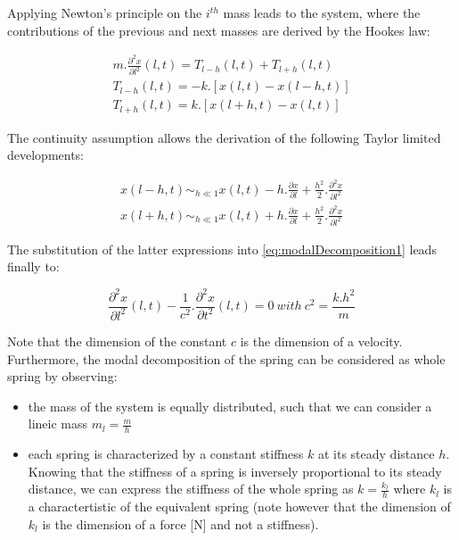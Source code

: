 Applying Newton's principle on the $i^{th}$ mass leads to the system, where the contributions of the previous and next masses are derived by the Hookes law:

\begin{eqnarray}
	m . \frac{\partial^2{x}}{\partial{l^2}}(l, t) = T_{l-h}(l, t) + T_{l+h}(l, t) \label{eq:modalDecomposition1} \\
	T_{l-h}(l, t) = -k . [x(l, t) - x(l-h, t)] \nonumber \\
	T_{l+h}(l, t) = k . [x(l+h, t) - x(l, t)] \nonumber
\end{eqnarray}

The continuity assumption allows the derivation of the following Taylor limited developments:

$$
\begin{array}{l}
	x(l-h, t) \sim_{h \ll 1} x(l, t) - h . \frac{\partial x}{\partial l} + \frac{h^2}{2} . \frac{\partial^2 x}{\partial l^2} \\
	x(l+h, t) \sim_{h \ll 1} x(l, t) + h . \frac{\partial x}{\partial l} + \frac{h^2}{2} . \frac{\partial^2 x}{\partial l^2}
\end{array}
$$

The substitution of the latter expressions into \myequname \eqref{eq:modalDecomposition1} leads finally to:

\begin{equation}
	\frac{\partial^2{x}}{\partial{l^2}}(l, t) - \frac{1}{c^2} . \frac{\partial^2{x}}{\partial{t^2}}(l, t) = 0\ with\ c^2 = \frac{k.h^2}{m} \label{eq:modalDecomposition2}
\end{equation}

Note that the dimension of the constant $c$ is the dimension of a velocity. Furthermore, the modal decomposition of the spring can be considered as whole spring by observing:

\begin{itemize}
	\item the mass of the system is equally distributed, such that we can consider a lineic mass $m_l = \frac{m}{h}$
	\item each spring is characterized by a constant stiffness $k$ at its steady distance $h$. Knowing that the stiffness of a spring is inversely proportional to its steady distance, we can express the stiffness of the whole spring as $k = \frac{k_l}{h}$ where $k_l$ is a charactertistic of the equivalent spring (note however that the dimension of $k_l$ is the dimension of a force [N] and not a stiffness).
\end{itemize}

